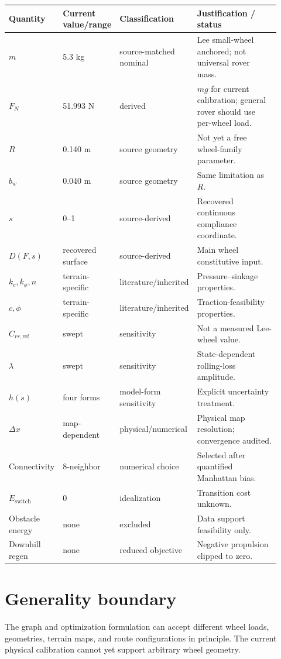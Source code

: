 \documentclass[11pt]{article}
\begin{document}
\begin{longtable}{p{0.17\linewidth}p{0.17\linewidth}p{0.22\linewidth}p{0.36\linewidth}}
\toprule
Quantity & Current value/range & Classification & Justification / status\\
\midrule
$m$ & 5.3 kg & source-matched nominal & Lee small-wheel anchored; not universal rover mass.\\
$F_N$ & 51.993 N & derived & $mg$ for current calibration; general rover should use per-wheel load.\\
$R$ & 0.140 m & source geometry & Not yet a free wheel-family parameter.\\
$b_w$ & 0.040 m & source geometry & Same limitation as $R$.\\
$s$ & 0--1 & source-derived & Recovered continuous compliance coordinate.\\
$D(F,s)$ & recovered surface & source-derived & Main wheel constitutive input.\\
$k_c,k_\phi,n$ & terrain-specific & literature/inherited & Pressure--sinkage properties.\\
$c,\phi$ & terrain-specific & literature/inherited & Traction-feasibility properties.\\
$C_{rr,\mathrm{ref}}$ & swept & sensitivity & Not a measured Lee-wheel value.\\
$\lambda$ & swept & sensitivity & State-dependent rolling-loss amplitude.\\
$h(s)$ & four forms & model-form sensitivity & Explicit uncertainty treatment.\\
$\Delta x$ & map-dependent & physical/numerical & Physical map resolution; convergence audited.\\
Connectivity & 8-neighbor & numerical choice & Selected after quantified Manhattan bias.\\
$E_{\mathrm{switch}}$ & 0 & idealization & Transition cost unknown.\\
Obstacle energy & none & excluded & Data support feasibility only.\\
Downhill regen & none & reduced objective & Negative propulsion clipped to zero.\\
\bottomrule
\end{longtable}

\section{Generality boundary}

The graph and optimization formulation can accept different wheel loads, geometries, terrain maps, and route configurations in principle. The current physical calibration cannot yet support arbitrary wheel geometry.
\end{document}
